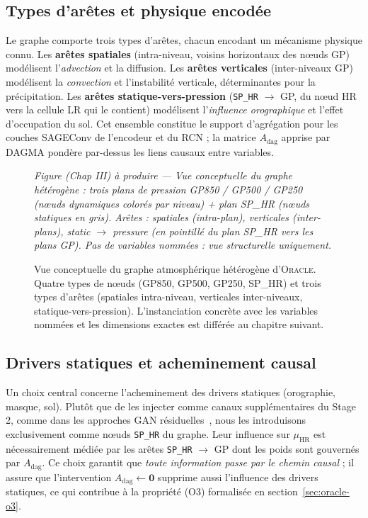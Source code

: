 \documentclass[14pt,a4paper,openany]{extreport}
\theoremstyle{definition}
\newcommand{\Oracle}{\textsc{Oracle}}
\newcommand{\HR}{\ensuremath{\text{HR}}}
\newcommand{\muHR}{\ensuremath{\mu_{\HR}}}
\newcommand{\Adag}{\ensuremath{A_{\mathrm{dag}}}}
\newcommand{\figplaceholder}[2][0.9\linewidth]{%
  \begin{tcolorbox}[width=#1,height=5cm,valign=center,colback=gray!8,colframe=gray!45,arc=2pt,boxrule=0.5pt]
    \centering\small\textit{#2}
  \end{tcolorbox}%
}
\begin{document}
\subsection{Types d'arêtes et physique encodée}
\label{ssec:oracle-types-aretes}

Le graphe comporte trois types d'arêtes, chacun encodant un mécanisme physique connu. Les \textbf{arêtes spatiales} (intra-niveau, voisins horizontaux des nœuds GP) modélisent l'\emph{advection} et la diffusion. Les \textbf{arêtes verticales} (inter-niveaux GP) modélisent la \emph{convection} et l'instabilité verticale, déterminantes pour la précipitation. Les \textbf{arêtes statique-vers-pression} (\texttt{SP\_HR} $\to$ GP, du nœud HR vers la cellule LR qui le contient) modélisent l'\emph{influence orographique} et l'effet d'occupation du sol. Cet ensemble constitue le support d'agrégation pour les couches SAGEConv de l'encodeur et du RCN ; la matrice $\Adag$ apprise par DAGMA pondère par-dessus les liens causaux entre variables.

\begin{figure}[ht]
  \centering
  \figplaceholder[0.85\linewidth]{Figure (Chap III) à produire --- Vue conceptuelle du graphe hétérogène : trois plans de pression GP850 / GP500 / GP250 (nœuds dynamiques colorés par niveau) + plan SP\_HR (nœuds statiques en gris). Arêtes : spatiales (intra-plan), verticales (inter-plans), static $\to$ pressure (en pointillé du plan SP\_HR vers les plans GP). Pas de variables nommées : vue structurelle uniquement.}
  \caption{Vue conceptuelle du graphe atmosphérique hétérogène d'\Oracle{}. Quatre types de nœuds (GP850, GP500, GP250, SP\_HR) et trois types d'arêtes (spatiales intra-niveau, verticales inter-niveaux, statique-vers-pression). L'instanciation concrète avec les variables nommées et les dimensions exactes est différée au chapitre suivant.}
  \label{fig:graphe-conceptuel}
\end{figure}

\subsection{Drivers statiques et acheminement causal}
\label{ssec:oracle-statics}

Un choix central concerne l'acheminement des drivers statiques (orographie, masque, sol). Plutôt que de les injecter comme canaux supplémentaires du Stage 2, comme dans les approches GAN résiduelles~\cite{rampal_cgan_2024}, nous les introduisons exclusivement comme nœuds \texttt{SP\_HR} du graphe. Leur influence sur $\muHR$ est nécessairement médiée par les arêtes \texttt{SP\_HR} $\to$ GP dont les poids sont gouvernés par $\Adag$. Ce choix garantit que \emph{toute information passe par le chemin causal} ; il assure que l'intervention $\Adag \leftarrow \mathbf{0}$ supprime aussi l'influence des drivers statiques, ce qui contribue à la propriété (O3) formalisée en section~\ref{sec:oracle-o3}.
\end{document}
